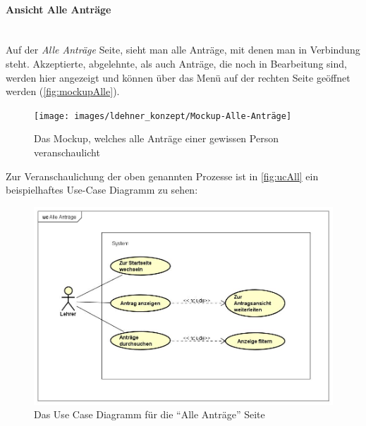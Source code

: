 \paragraph{Ansicht Alle Anträge}
~\\
Auf der \textit{Alle Anträge} Seite, sieht man alle Anträge, mit denen man in Verbindung steht. Akzeptierte, abgelehnte, als auch Anträge, die noch in Bearbeitung sind, werden hier angezeigt und können über das Menü auf der rechten Seite geöffnet werden (\autoref{fig:mockupAlle}).
\begin{figure}[H]
	\centering
	\texttt{[image: images/ldehner\_konzept/Mockup-Alle-Anträge]}
	\caption[Mockup Alle Anträge]{Das Mockup, welches alle Anträge einer gewissen Person veranschaulicht}
	\label{fig:mockupAlle}
\end{figure}
Zur Veranschaulichung der oben genannten Prozesse ist in \autoref{fig:ucAll} ein beispielhaftes Use-Case Diagramm zu sehen: 
\begin{figure}[H]
	\centering
	\includegraphics[width=1\linewidth]{images/ldehner_konzept/uc-all}
	\caption[Use Case Diagramm Alle Anträge]{Das Use Case Diagramm für die \enquote{Alle Anträge} Seite}
	\label{fig:ucAll}
\end{figure}
\newpage
